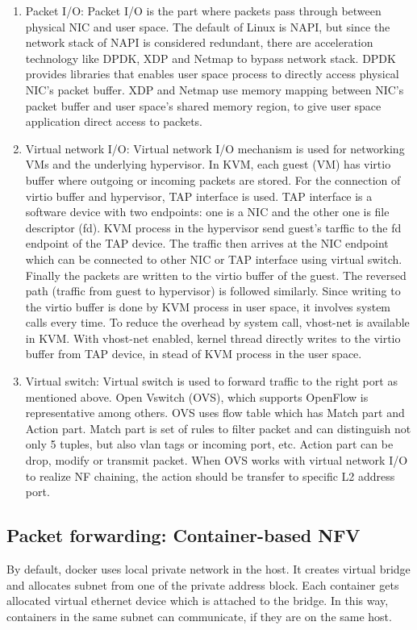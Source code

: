 \begin{enumerate}
	\item Packet I/O: 
	 Packet I/O is the part where packets pass through between physical NIC and user space. The default of Linux is NAPI, but since the network stack of NAPI is considered redundant, there are acceleration technology like DPDK, XDP and Netmap to bypass network stack. DPDK provides libraries that enables user space process to directly access physical NIC's packet buffer. XDP and Netmap use memory mapping between NIC's packet buffer and user space's shared memory region, to give user space application direct access to packets. 
	\item Virtual network I/O: 
	Virtual network I/O mechanism is used for networking VMs and the underlying hypervisor. In KVM, each guest (VM) has virtio buffer where outgoing or incoming packets are stored. For the connection of virtio buffer and hypervisor, TAP interface is used. TAP interface is a software device with two endpoints: one is a NIC and the other one is file descriptor (fd). KVM process in the hypervisor send guest's tarffic to the fd endpoint of the TAP device. The traffic then arrives at the NIC endpoint which can be connected to other NIC or TAP interface using virtual switch. Finally the packets are written to the virtio buffer of the guest. The reversed path (traffic from guest to hypervisor) is followed similarly. Since writing to the virtio buffer is done by KVM process in user space, it involves system calls every time. To reduce the overhead by system call, vhost-net is available in KVM. With vhost-net enabled, kernel thread directly writes to the virtio buffer from TAP device, in stead of KVM process in the user space. 
	\item Virtual switch: 
	Virtual switch is used to forward traffic to the right port as mentioned above. Open Vswitch (OVS), which supports OpenFlow is representative among others. OVS uses flow table which has Match part and Action part. Match part is set of rules to filter packet and can distinguish not only 5 tuples, but also vlan tags or incoming port, etc. Action part can be drop, modify or transmit packet. When OVS works with virtual network I/O to realize NF chaining, the action should be transfer to specific L2 address port. 
\end{enumerate}

\subsection{Packet forwarding: Container-based NFV}
By default, docker uses local private network in the host. It creates virtual bridge and allocates subnet from one of the private address block. Each container gets allocated virtual ethernet device which is attached to the bridge. In this way, containers in the same subnet can communicate, if they are on the same host. 

